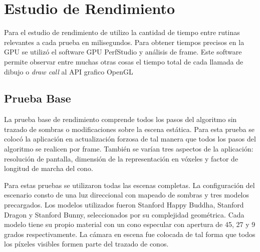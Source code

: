 \section{Estudio de Rendimiento}

Para el estudio de rendimiento de utilizo la cantidad de tiempo entre rutinas relevantes a cada prueba en milisegundos. Para obtener tiempos precisos en la \ac{GPU} se utilizó el software GPU PerfStudio y análisis de frame. Este software permite observar entre muchas otras cosas el tiempo total de cada llamada de dibujo o \emph{draw call} al API grafico OpenGL

\subsection{Prueba Base}
La prueba base de rendimiento comprende todos los pasos del algoritmo sin trazado de sombras o modificaciones sobre la escena estática. Para esta prueba se colocó la aplicación en actualización forzosa de tal manera que todos los pasos del algoritmo se realicen por frame. También se varían tres aspectos de la aplicación: resolución de pantalla, dimensión de la representación en vóxeles y factor de longitud de marcha del cono.

Para estas pruebas se utilizaron todas las escenas completas. La configuración del escenario consto de una luz direccional con mapeado de sombras y tres modelos precargados. Los modelos utilizados fueron Stanford Happy Buddha, Stanford Dragon y Stanford Bunny, seleccionados por su complejidad geométrica. Cada modelo tiene su propio material con un cono especular con apertura de 45, 27 y 9 grados respectivamente. La cámara en escena fue colocada de tal forma que todos los píxeles  visibles formen parte del trazado de conos. 

